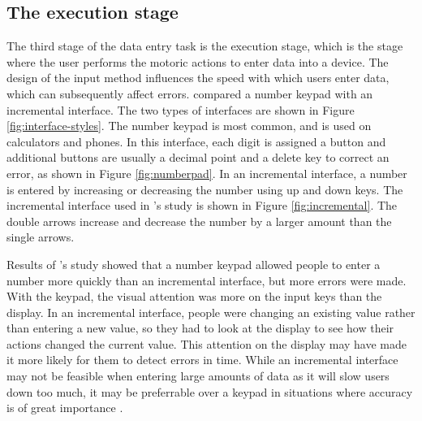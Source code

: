 
\subsection{The execution stage}
The third stage of the data entry task is the execution stage, which is the stage where the user performs the motoric actions to enter data into a device. The design of the input method influences the speed with which users enter data, which can subsequently affect errors. \citet{Oladimeji2011} compared a number keypad with an incremental interface. The two types of interfaces are shown in Figure \ref{fig:interface-styles}. The number keypad is most common, and is used on calculators and phones. In this interface, each digit is assigned a button and additional buttons are usually a decimal point and a delete key to correct an error, as shown in Figure \ref{fig:numberpad}. In an incremental interface, a number is entered by increasing or decreasing the number using up and down keys. The incremental interface used in \citeauthor{Oladimeji2011}'s study is shown in Figure \ref{fig:incremental}. The double arrows increase and decrease the number by a larger amount than the single arrows. 

Results of \citeauthor{Oladimeji2011}'s study showed that a number keypad allowed people to enter a number more quickly than an incremental interface, but more errors were made. With the keypad, the visual attention was more on the input keys than the display. In an incremental interface, people were changing an existing value rather than entering a new value, so they had to look at the display to see how their actions changed the current value. This attention on the display may have made it more likely for them to detect errors in time. While an incremental interface may not be feasible when entering large amounts of data as it will slow users down too much, it may be preferrable over a keypad in situations where accuracy is of great importance \citep{Thimbleby2011}. 

